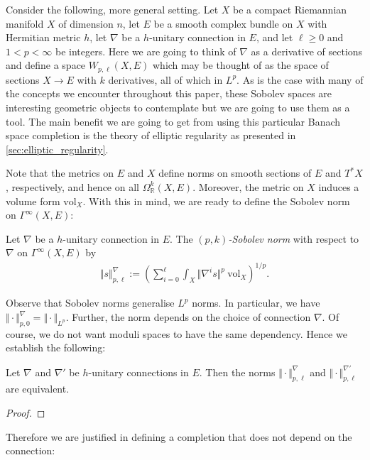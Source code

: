 \documentclass[12pt]{ociamthesis}  %
\begin{document}
Consider the following, more general setting. Let $X$ be a compact
Riemannian manifold $X$ of dimension $n$, let $E$ be a smooth complex
bundle on $X$ with Hermitian metric $h$, let $\nabla$ be a $h$-unitary
connection in $E$, and let $\ell\geq 0$ and $1<p<\infty$ be integers.
Here we are going to think of $\nabla$ as a derivative of sections and
define a space $W_{p,\ell}(X,E)$ which may be thought of as the space of
sections $X\to E$ with $k$ derivatives, all of which in $L^p$. As
is the case with many of the concepts we encounter throughout this paper,
these Sobolev spaces are interesting geometric objects to
contemplate but we are going to use them as a tool. The main
benefit we are going to get from using this particular Banach space
completion is the theory of elliptic regularity as presented in
\ref{sec:elliptic_regularity}.

Note that the metrics on $E$ and $X$ define norms on smooth sections
of $E$ and $T^*X$, respectively, and hence on all
$\Omega^k_{\mathbb{R}}(X,E)$.
Moreover, the metric on $X$ induces a volume form $\text{vol}_X$.
With this in mind, we are ready to define the Sobolev norm on
$\Gamma^\infty(X,E)$:

\begin{definition}
  Let $\nabla$ be a $h$-unitary connection in $E$.
  The \emph{$(p,k)$-Sobolev norm} with respect to $\nabla$ on
  $\Gamma^\infty(X,E)$ by
  \begin{align*}
    \Vert s\Vert_{p,\ell}^\nabla := \left(
    \sum_{i=0}^\ell \int_X \Vert \nabla^i s \Vert^p\:\text{vol}_X
    \right)^{1/p}.
  \end{align*}
\end{definition}

Observe that Sobolev norms generalise $L^p$ norms. In particular,
we have $\Vert\cdot\Vert^\nabla_{p,0} = \Vert\cdot\Vert_{L^p}$.
Further, the norm depends on the choice of connection $\nabla$. Of
course, we do not want moduli spaces to have the same dependency. Hence
we establish the following:
\begin{lemma}
  Let $\nabla$ and $\nabla'$ be $h$-unitary connections in $E$. Then the
  norms $\Vert\cdot\Vert_{p,\ell}^\nabla$ and
  $\Vert\cdot\Vert_{p,\ell}^{\nabla'}$ are equivalent.
  \begin{proof}
    \missingproof
  \end{proof}
\end{lemma}

Therefore we are justified in defining a completion that does not depend
on the connection:
\end{document}
